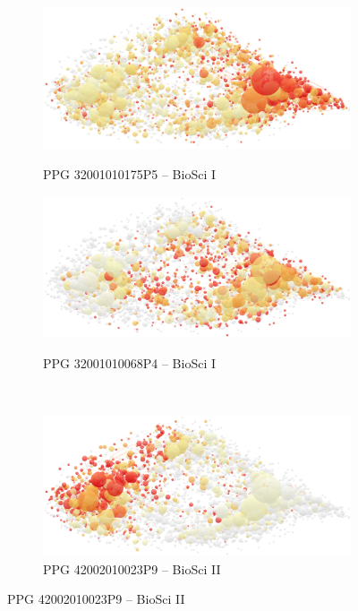\begin{figure}[H]
\vspace{12pt}
\captionsetup[sub]{justification=raggedright, singlelinecheck=false}
  \begin{subfigure}[t]{.48\textwidth}
    \centering
    \caption{PPG 32001010175P5 – BioSci I}
    \includegraphics[width=\linewidth]{images/chapter_classific/VOSviewer-CBIa.png}
    \label{fig:classif:vosviewer_cb1a}
  \end{subfigure}
  \hfill
  \begin{subfigure}[t]{.48\textwidth}
    \centering
    \caption{PPG 32001010068P4 – BioSci I}
    \includegraphics[width=\linewidth]{images/chapter_classific/VOSviewer-CBIb.png}
    \label{fig:classif:vosviewer_cb1b}
  \end{subfigure}\\ %
    \begin{subfigure}[t]{.48\textwidth}
    \centering
    \caption{PPG 42002010023P9 – BioSci II}
    \includegraphics[width=\linewidth]{images/chapter_classific/VOSviewer-CBIIa.png}

\end{subfigure}
\end{figure}
